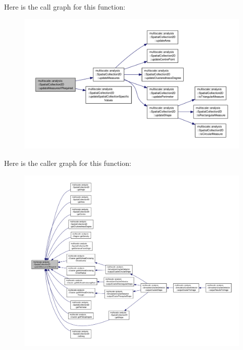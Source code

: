 Here is the call graph for this function\-:
\nopagebreak
\begin{figure}[H]
\begin{center}
\leavevmode
\includegraphics[width=350pt]{classmultiscale_1_1analysis_1_1SpatialCollection2D_a731de1009ba24b4fda5003c9cec5196c_cgraph}
\end{center}
\end{figure}




Here is the caller graph for this function\-:
\nopagebreak
\begin{figure}[H]
\begin{center}
\leavevmode
\includegraphics[width=350pt]{classmultiscale_1_1analysis_1_1SpatialCollection2D_a731de1009ba24b4fda5003c9cec5196c_icgraph}
\end{center}
\end{figure}


